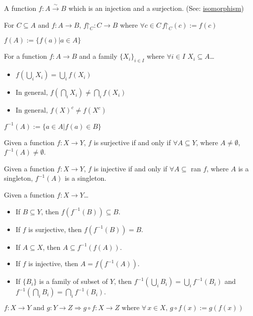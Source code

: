 \label{bijection}
A function $f: A \xrightarrow{\sim} B$ which is an injection and a surjection. (See: \hyperref[isomorphism]{isomorphism})

\label{restriction}
For $C \subseteq A$ and $f:A \rightarrow B$, $\ensuremath{f\mathord{\upharpoonright}_C:C \rightarrow B}$ where \mbox{$\forall c \in C \, \ensuremath{f\mathord{\upharpoonright}_C(c)} := f(c)$}

\label{image}
$f(A) := \{f(a) | a \in A \}$

\begin{proposition}
For a function $f : A \rightarrow B$ and a family $\{X_i\}_{i \in I}$ where $\forall i \in I$ $X_i \subseteq A$\dots
\begin{itemize}
  \item $f(\bigcup_i X_i) = \bigcup_i f(X_i)$
  \item $\textrm{In general, } f(\bigcap_i X_i) \neq \bigcap_i f(X_i)$
  \item $\textrm{In general, } f(X)^c \neq f(X^c)$
\end{itemize}
\end{proposition}

\label{preimage}
$f^{-1}(A) := \{a \in A | f(a) \in B \}$

\begin{proposition}
Given a function $f: X \rightarrow Y$, $f$ is surjective if and only if $\forall A \subseteq Y$, where $A \neq \emptyset$, $f^{-1}(A) \neq \emptyset$.
\end{proposition}

\begin{proposition}
Given a function $f: X \rightarrow Y$, $f$ is injective if and only if $\forall A \subseteq$ ran $f$, where $A$ is a singleton, $f^{-1}(A)$ is a singleton.
\end{proposition}

\begin{proposition}
Given a function $f : X \rightarrow Y$\dots
\begin{itemize}
  \item If $B \subseteq Y$, then $f(f^{-1}(B)) \subseteq B.$
  \item If $f$ is surjective, then $f(f^{-1}(B)) = B.$
  \item If $A \subseteq X$, then $A \subseteq f^{-1}(f(A)).$
  \item If $f$ is injective, then $A = f(f^{-1}(A)).$
  \item If $\{B_i\}$ is a family of subset of $Y$, then $f^{-1}(\bigcup_i B_i)=\bigcup_i f^{-1}(B_i)$ and $f^{-1}(\bigcap_i B_i)=\bigcap_i f^{-1}(B_i).$
\end{itemize}
\end{proposition}

\label{functioncomposition}
$f:X \rightarrow Y \textrm{ and } g:Y \rightarrow Z \Rightarrow g \circ f:X \rightarrow Z \textrm{ where } \forall \, x \in X, \, g \circ f(x) := g(f(x))$

